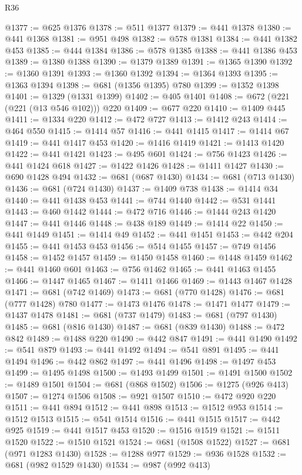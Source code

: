 \begin{lexlean}{R36}
\begin{coremodule}
{{{{{{{{{{{{{{{{{{{{{{{{{{{{{{{{{{{{{{{{{{{{{{{{{{{{{{{{{{{{{{{{{{{{{{{{{{{{{{{{{{@1377 := @625 @1376
@1378 := @511 @1377
@1379 := @441 @1378
@1380 := @441 @1368
@1381 := @951 @498
@1382 := @578 @1381
@1384 := @441 @1382 @453
@1385 := @444 @1384
@1386 := @578 @1385
@1388 := @441 @1386 @453
@1389 := @1380 @1388
@1390 := @1379 @1389
@1391 := @1365 @1390
@1392 := @1360 @1391
@1393 := @1360 @1392
@1394 := @1364 @1393
@1395 := @1363 @1394
@1398 := @681 (@1356 @1395) @780
@1399 := @1352 @1398
@1401 := @1329 (@1331 @1399)
@1402 := @405 @1401
@1408 := @672 (@221 (@221 (@13 @546 @102))) @220
@1409 := @677 @220
@1410 := @1409 @445
@1411 := @1334 @220
@1412 := @472 @727
@1413 := @1412 @243
@1414 := @464 @550
@1415 := @1414 @57
@1416 := @441 @1415
@1417 := @1414 @67
@1419 := @441 @1417 @453
@1420 := @1416 @1419
@1421 := @1413 @1420
@1422 := @441 @1421
@1423 := @495 @601
@1424 := @756 @1423
@1426 := @441 @1424 @618
@1427 := @1422 @1426
@1428 := @1411 @1427
@1430 := @690 @1428 @494
@1432 := @681 (@687 @1430)
@1434 := @681 (@713 @1430)
@1436 := @681 (@724 @1430)
@1437 := @1409 @738
@1438 := @1414 @34
@1440 := @441 @1438 @453
@1441 := @744 @1440
@1442 := @531 @1441
@1443 := @460 @1442
@1444 := @472 @716
@1446 := @1444 @243 @1420
@1447 := @441 @1446
@1448 := @438 @189
@1449 := @1414 @22
@1450 := @441 @1449
@1451 := @1414 @49
@1452 := @441 @1451
@1453 := @442 @204
@1455 := @441 @1453 @453
@1456 := @514 @1455
@1457 := @749 @1456
@1458 := @1452 @1457
@1459 := @1450 @1458
@1460 := @1448 @1459
@1462 := @441 @1460 @601
@1463 := @756 @1462
@1465 := @441 @1463 @1455
@1466 := @1447 @1465
@1467 := @1411 @1466
@1469 := @1443 @1467 @1428
@1471 := @681 (@742 @1469)
@1473 := @681 (@770 @1428)
@1476 := @681 (@777 @1428) @780
@1477 := @1473 @1476
@1478 := @1471 @1477
@1479 := @1437 @1478
@1481 := @681 (@737 @1479)
@1483 := @681 (@797 @1430)
@1485 := @681 (@816 @1430)
@1487 := @681 (@839 @1430)
@1488 := @472 @842
@1489 := @1488 @220
@1490 := @442 @847
@1491 := @441 @1490
@1492 := @541 @879
@1493 := @441 @1492
@1494 := @541 @891
@1495 := @441 @1494
@1496 := @442 @862
@1497 := @441 @1496
@1498 := @1497 @453
@1499 := @1495 @1498
@1500 := @1493 @1499
@1501 := @1491 @1500
@1502 := @1489 @1501
@1504 := @681 (@868 @1502)
@1506 := @1275 (@926 @413)
@1507 := @1274 @1506
@1508 := @921 @1507
@1510 := @472 @920 @220
@1511 := @441 @894
@1512 := @441 @898
@1513 := @1512 @953
@1514 := @1512 @1513
@1515 := @541 @1514
@1516 := @441 @1515
@1517 := @442 @925
@1519 := @441 @1517 @453
@1520 := @1516 @1519
@1521 := @1511 @1520
@1522 := @1510 @1521
@1524 := @681 (@1508 @1522)
@1527 := @681 (@971 @1283 @1430)
@1528 := @1288 @977
@1529 := @936 @1528
@1532 := @681 (@982 @1529 @1430)
@1534 := @987 (@992 @413)
}}}}}}}}}}}}}}}}}}}}}}}}}}}}}}}}}}}}}}}}}}}}}}}}}}}}}}}}}}}}}}}}}}}}}}}}}}}}}}}}}}
\end{coremodule}
\end{lexlean}
